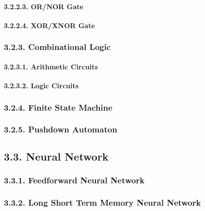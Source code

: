 \documentclass[]{article}
\let\oldparagraph\paragraph
\renewcommand{\paragraph}[1]{\oldparagraph{#1}\mbox{}}
\begin{document}
\paragraph{3.2.2.3. OR/NOR Gate}\label{ornor-gate}

\paragraph{3.2.2.4. XOR/XNOR Gate}\label{xorxnor-gate}

\subsubsection{3.2.3. Combinational Logic}\label{combinational-logic}

\paragraph{3.2.3.1. Arithmetic Circuits}\label{arithmetic-circuits}

\paragraph{3.2.3.2. Logic Circuits}\label{logic-circuits}

\subsubsection{3.2.4. Finite State Machine}\label{finite-state-machine}

\subsubsection{3.2.5. Pushdown Automaton}\label{pushdown-automaton}

\subsection{3.3. Neural Network}\label{neural-network}

\subsubsection{3.3.1. Feedforward Neural
Network}\label{feedforward-neural-network}

\subsubsection{3.3.2. Long Short Term Memory Neural
Network}\label{long-short-term-memory-neural-network}
\end{document}
